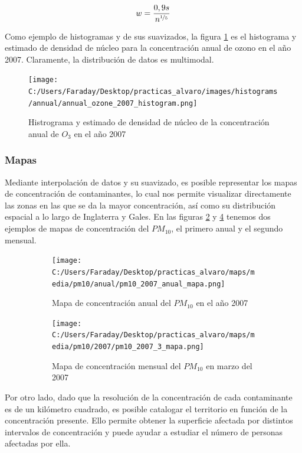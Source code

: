 \documentclass[12pt]{article}
\begin{document}
\begin{equation}
w = \frac{0,9 s}{n^{\nicefrac{1}{5}}}
\label{eq:parametro-w}
\end{equation}

Como ejemplo de histogramas y de sus suavizados, la figura \ref{fig:hist-ejem-1} es el histograma y estimado de densidad de núcleo para la concentración anual de ozono en el año 2007. Claramente, la distribución de datos es multimodal.

\begin{figure}[H]
\centering
\texttt{[image: C:/Users/Faraday/Desktop/practicas\_alvaro/images/histograms/annual/annual\_ozone\_2007\_histogram.png]}
\caption{Histrograma y estimado de densidad de núcleo de la concentración anual de $O_{3}$ en el año 2007}
\label{fig:hist-ejem-1}
\end{figure}

\subsubsection{Mapas}

Mediante interpolación de datos y su suavizado, es posible representar los mapas de concentración de contaminantes, lo cual nos permite visualizar directamente las zonas en las que se da la mayor concentración, así como su distribución espacial a lo largo de Inglaterra y Gales. En las figuras \ref{fig:map-ejem-1} y \ref{fig:map-ejem-2} tenemos dos ejemplos de mapas de concentración del $PM_{10}$, el primero anual y el segundo mensual.

\begin{figure}[H]
\centering
\begin{subfigure}[H]{0.45\textwidth}
\texttt{[image: C:/Users/Faraday/Desktop/practicas\_alvaro/maps/media/pm10/anual/pm10\_2007\_anual\_mapa.png]}
\caption{Mapa de concentración anual del $PM_{10}$ en el año 2007}
\label{fig:map-ejem-1}
\end{subfigure}
%
\begin{subfigure}[H]{0.45\textwidth}
\texttt{[image: C:/Users/Faraday/Desktop/practicas\_alvaro/maps/media/pm10/2007/pm10\_2007\_3\_mapa.png]}
\caption{Mapa de concentración mensual del $PM_{10}$ en marzo del 2007}
\label{fig:map-ejem-2}
\end{subfigure}
\caption{}
\end{figure}

Por otro lado, dado que la resolución de la concentración de cada contaminante es de un kilómetro cuadrado, es posible catalogar el territorio en función de la concentración presente. Ello permite obtener la superficie afectada por distintos intervalos de concentración y puede ayudar a estudiar el número de personas afectadas por ella.
\end{document}
